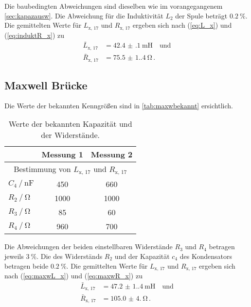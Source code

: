 Die baubedingten Abweichungen sind dieselben wie im vorangegangenem \autoref{sec:kapazausw}.
Die Abweichung für die Induktivität $L_2$ der Spule beträgt $\qty{0.2}{\percent}$.
Die gemittelten Werte für $L_\text{x, 17}$ und $R_\text{x, 17}$ ergeben sich nach (\ref{eq:L_x}) und (\ref{eq:induktR_x}) zu
\begin{align*}
  \bar{L}_\text{x, 17} &= \qty{42.4(1)}{\milli\henry} \quad \text{und} \\
  \bar{R}_\text{x, 17} &= \qty{75.5(1.4)}{\ohm} \, .
\end{align*}

\subsection{Maxwell Brücke} \label{sec:maxwausw}

Die Werte der bekannten Kenngrößen sind in \autoref{tab:maxwbekannt} ersichtlich.
\begin{table}
  \centering
  \caption{Werte der bekannten Kapazität und der Widerstände.}
  \label{tab:maxwbekannt}
  \begin{tabular}{lcc}
    \toprule
     & Messung 1 & Messung 2  \\
    \midrule
    \multicolumn{3}{c}{ Bestimmung von $L_{\text{x, 17}}$ und $R_{\text{x, 17}}$ } \\
    $C_4 \mathbin{/} \unit{\nano\farad}$  &  450 &  660 \\
    $R_2 \mathbin{/} \unit{\ohm}$         & 1000 & 1000 \\
    $R_3 \mathbin{/} \unit{\ohm}$         &   85 &   60 \\
    $R_4 \mathbin{/} \unit{\ohm}$         &  960 &  700 \\
    \bottomrule
  \end{tabular}
\end{table}

Die Abweichungen der beiden einstellbaren Widerstände $R_3$ und $R_4$ betragen jeweils  $\qty{3}{\percent}$.
Die des Widerständs $R_2$ und der Kapazität $c_4$ des Kondensators betragen beide $\qty{0.2}{\percent}$.
Die gemittelten Werte für $L_\text{x, 17}$ und $R_\text{x, 17}$ ergeben sich nach (\ref{eq:maxwL_x}) und (\ref{eq:maxwR_x}) zu
\begin{align*}
  \bar{L}_\text{x, 17} &= \qty{47.2(1.4)}{\milli\henry} \quad \text{und} \\
  \bar{R}_\text{x, 17} &= \qty{105.0(4.0)}{\ohm} \, .
\end{align*}


